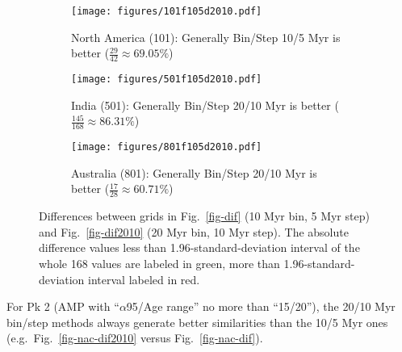 \begin{figure*}
	\centering
	\begin{subfigure}{1.01\textwidth}
		\texttt{[image: figures/101f105d2010.pdf]}
		\caption{North America (101): Generally Bin/Step 10/5 Myr is better
		($\frac{29}{42}\approx69.05\%$)}\label{fig-101f105d2010}
	\end{subfigure}
	\vspace{1em}
	\begin{subfigure}{1.01\textwidth}
		\texttt{[image: figures/501f105d2010.pdf]}
		\caption{India (501): Generally Bin/Step 20/10 Myr is better
		($\frac{145}{168}\approx86.31\%$)}\label{fig-501f105d2010}
	\end{subfigure}
	\vspace{1em}
	\begin{subfigure}{1.01\textwidth}
		\texttt{[image: figures/801f105d2010.pdf]}
		\caption{Australia (801): Generally Bin/Step 20/10 Myr is better
		($\frac{17}{28}\approx60.71\%$)}\label{fig-801f105d2010}
	\end{subfigure}
	\caption[]{Differences between grids in Fig.~\ref{fig-dif} (10 Myr bin, 5
Myr step) and Fig.~\ref{fig-dif2010} (20 Myr bin, 10 Myr step). The absolute
difference values less than 1.96-standard-deviation interval of the whole 168
values are labeled in green, more than 1.96-standard-deviation interval labeled
in red.}\label{fig-f105d2010}
\end{figure*}

For Pk 2 (AMP with ``$\alpha$95/Age range'' no more than
``15\degree/20\degree''), the 20/10 Myr bin/step methods always generate better
similarities than the 10/5 Myr ones (e.g.\ Fig.~\ref{fig-nac-dif2010} versus
Fig.~\ref{fig-nac-dif}).

